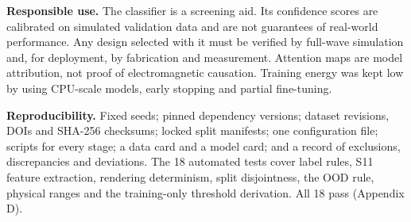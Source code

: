 \documentclass[11pt,a4paper]{article}
\begin{document}
\textbf{Responsible use.} The classifier is a screening aid. Its confidence scores are calibrated on simulated validation data and are not guarantees of real-world performance. Any design selected with it must be verified by full-wave simulation and, for deployment, by fabrication and measurement. Attention maps are model attribution, not proof of electromagnetic causation. Training energy was kept low by using CPU-scale models, early stopping and partial fine-tuning.

\textbf{Reproducibility.} Fixed seeds; pinned dependency versions; dataset revisions, DOIs and SHA-256 checksums; locked split manifests; one configuration file; scripts for every stage; a data card and a model card; and a record of exclusions, discrepancies and deviations. The 18 automated tests cover label rules, S11 feature extraction, rendering determinism, split disjointness, the OOD rule, physical ranges and the training-only threshold derivation. All 18 pass (Appendix D).
\end{document}
